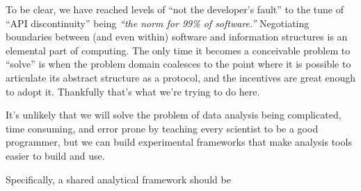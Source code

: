 \documentclass[10pt]{tufte-book}
\begin{document}
To be clear, we have reached levels of ``not the developer's fault'' to
the tune of ``API discontinuity'' being \emph{``the norm for 99\% of
software.''} Negotiating boundaries between (and even within) software
and information structures is an elemental part of computing. The only
time it becomes a conceivable problem to ``solve'' is when the problem
domain coalesces to the point where it is possible to articulate its
abstract structure as a protocol, and the incentives are great enough to
adopt it. Thankfully that's what we're trying to do here.

It's unlikely that we will solve the problem of data analysis being
complicated, time consuming, and error prone by teaching every scientist
to be a good programmer, but we can build experimental frameworks that
make analysis tools easier to build and use.

Specifically, a shared analytical framework should be
\end{document}
